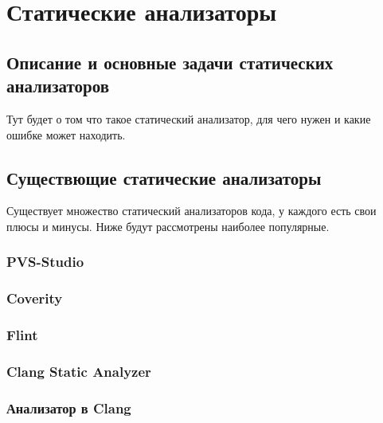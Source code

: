 \chapter{Статические анализаторы}

\section{Описание и основные задачи статических анализаторов}
Тут будет о том что такое статический анализатор, для чего нужен и какие ошибке может находить.

\section{Существющие статические анализаторы}

Существует множество статический анализаторов кода, у каждого есть свои плюсы и минусы. 
Ниже будут рассмотрены наиболее популярные.

\subsection{PVS-Studio}
\subsection{Coverity}
\subsection{Flint}
\subsection{Clang Static Analyzer}
\subsection{Анализатор в Clang}
